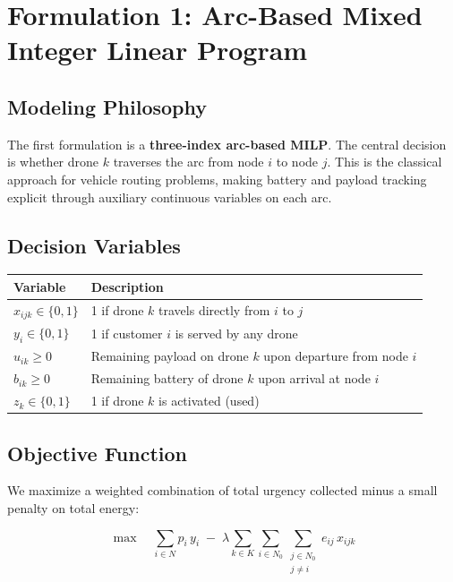 \documentclass[12pt,a4paper]{article}
\begin{document}
\section{Formulation 1: Arc-Based Mixed Integer Linear Program}

\subsection{Modeling Philosophy}

The first formulation is a \textbf{three-index arc-based MILP}. The central decision is
whether drone $k$ traverses the arc from node $i$ to node $j$. This is the classical
approach for vehicle routing problems, making battery and payload tracking explicit
through auxiliary continuous variables on each arc.

\subsection{Decision Variables}

\begin{center}
\begin{tabular}{ll}
\toprule
Variable & Description \\
\midrule
$x_{ijk} \in \{0,1\}$ & 1 if drone $k$ travels directly from $i$ to $j$ \\
$y_i \in \{0,1\}$ & 1 if customer $i$ is served by any drone \\
$u_{ik} \geq 0$ & Remaining payload on drone $k$ upon departure from node $i$ \\
$b_{ik} \geq 0$ & Remaining battery of drone $k$ upon arrival at node $i$ \\
$z_k \in \{0,1\}$ & 1 if drone $k$ is activated (used) \\
\bottomrule
\end{tabular}
\end{center}

\subsection{Objective Function}

We maximize a weighted combination of total urgency collected minus a small penalty on
total energy:

\begin{equation}
  \max \quad \sum_{i \in N} p_i \, y_i \;-\; \lambda \sum_{k \in K} \sum_{i \in N_0}
  \sum_{\substack{j \in N_0 \\ j \neq i}} e_{ij} \, x_{ijk}
  \tag{F1-Obj}
\end{equation}
\end{document}
